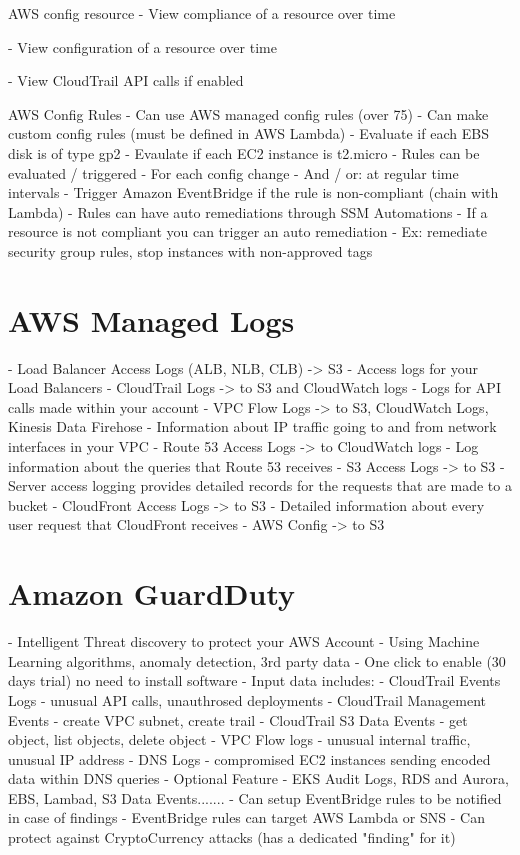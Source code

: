 \documentclass[11pt]{book}
\begin{document}
    AWS config resource
    - View compliance of a resource over time

    - View configuration of a resource over time

    - View CloudTrail API calls if enabled

    AWS Config Rules
    - Can use AWS managed config rules (over 75)
    - Can make custom config rules (must be defined in AWS Lambda)
        - Evaluate if each EBS disk is of type gp2
        - Evaulate if each EC2 instance is t2.micro
    - Rules can be evaluated / triggered
        - For each config change
        - And / or: at regular time intervals
    - Trigger Amazon EventBridge if the rule is non-compliant (chain with Lambda)
    - Rules can have auto remediations through SSM Automations
        - If a resource is not compliant you can trigger an auto remediation
        - Ex: remediate security group rules, stop instances with non-approved tags

    \section{AWS Managed Logs}
    - Load Balancer Access Logs (ALB, NLB, CLB) -> S3
        - Access logs for your Load Balancers
    - CloudTrail Logs -> to S3 and CloudWatch logs
        - Logs for API calls made within your account
    - VPC Flow Logs -> to S3, CloudWatch Logs, Kinesis Data Firehose
        - Information about IP traffic going to and from network interfaces in your VPC
    - Route 53 Access Logs -> to CloudWatch logs
        - Log information about the queries that Route 53 receives
    - S3 Access Logs -> to S3
        - Server access logging provides detailed records for the requests that are made to a bucket
    - CloudFront Access Logs -> to S3
        - Detailed information about every user request that CloudFront receives
    - AWS Config -> to S3

    \section{Amazon GuardDuty}

    - Intelligent Threat discovery to protect your AWS Account
    - Using Machine Learning algorithms, anomaly detection, 3rd party data
    - One click to enable (30 days trial) no need to install software
    - Input data includes:
        - CloudTrail Events Logs - unusual API calls, unauthrosed deployments
            - CloudTrail Management Events - create VPC subnet, create trail
            - CloudTrail S3 Data Events - get object, list objects, delete object
        - VPC Flow logs - unusual internal traffic, unusual IP address
        - DNS Logs - compromised EC2 instances sending encoded data within DNS queries
        - Optional Feature - EKS Audit Logs, RDS and Aurora, EBS, Lambad, S3 Data Events.......
    - Can setup EventBridge rules to be notified in case of findings
    - EventBridge rules can target AWS Lambda or SNS
    - Can protect against CryptoCurrency attacks (has a dedicated "finding" for it)
\end{document}
